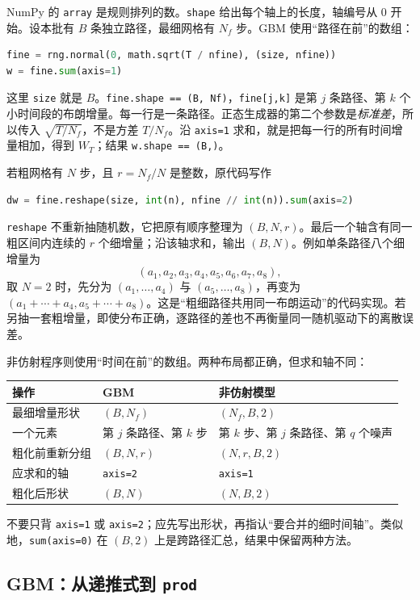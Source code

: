 NumPy 的 \texttt{array} 是规则排列的数。\texttt{shape} 给出每个轴上的长度，轴编号从 0 开始。设本批有 $B$ 条独立路径，最细网格有 $N_f$ 步。GBM 使用“路径在前”的数组：
\begin{lstlisting}[language=Python]
fine = rng.normal(0, math.sqrt(T / nfine), (size, nfine))
w = fine.sum(axis=1)
\end{lstlisting}
这里 \texttt{size} 就是 $B$。\texttt{fine.shape == (B, Nf)}，\texttt{fine[j,k]} 是第 $j$ 条路径、第 $k$ 个小时间段的布朗增量。每一行是一条路径。正态生成器的第二个参数是\emph{标准差}，所以传入 $\sqrt{T/N_f}$，不是方差 $T/N_f$。沿 \texttt{axis=1} 求和，就是把每一行的所有时间增量相加，得到 $W_T$；结果 \texttt{w.shape == (B,)}。

若粗网格有 $N$ 步，且 $r=N_f/N$ 是整数，原代码写作
\begin{lstlisting}[language=Python]
dw = fine.reshape(size, int(n), nfine // int(n)).sum(axis=2)
\end{lstlisting}
\texttt{reshape} 不重新抽随机数，它把原有顺序整理为 $(B,N,r)$。最后一个轴含有同一粗区间内连续的 $r$ 个细增量；沿该轴求和，输出 $(B,N)$。例如单条路径八个细增量为
\[
(a_1,a_2,a_3,a_4,a_5,a_6,a_7,a_8),
\]
取 $N=2$ 时，先分为 $(a_1,\ldots,a_4)$ 与 $(a_5,\ldots,a_8)$，再变为 $(a_1+\cdots+a_4,a_5+\cdots+a_8)$。这是“粗细路径共用同一布朗运动”的代码实现。若另抽一套粗增量，即使分布正确，逐路径的差也不再衡量同一随机驱动下的离散误差。

非仿射程序则使用“时间在前”的数组。两种布局都正确，但求和轴不同：
\begin{center}
\small
\begin{tabularx}{\textwidth}{@{}lYY@{}}
\toprule
操作 & GBM & 非仿射模型\\
\midrule
最细增量形状 & $(B,N_f)$ & $(N_f,B,2)$\\
一个元素 & 第 $j$ 条路径、第 $k$ 步 & 第 $k$ 步、第 $j$ 条路径、第 $q$ 个噪声\\
粗化前重新分组 & $(B,N,r)$ & $(N,r,B,2)$\\
应求和的轴 & \texttt{axis=2} & \texttt{axis=1}\\
粗化后形状 & $(B,N)$ & $(N,B,2)$\\
\bottomrule
\end{tabularx}
\end{center}
不要只背 \texttt{axis=1} 或 \texttt{axis=2}；应先写出形状，再指认“要合并的细时间轴”。类似地，\texttt{sum(axis=0)} 在 $(B,2)$ 上是跨路径汇总，结果中保留两种方法。

\subsection{GBM：从递推式到 \texttt{prod}}

